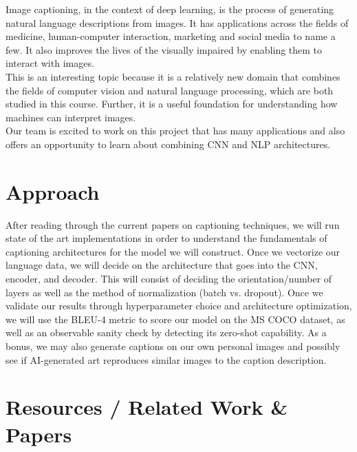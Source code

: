 \documentclass[10pt,twocolumn,letterpaper]{article}
\begin{document}
Image captioning, in the context of deep learning, is the process of generating natural language descriptions from images.
It has applications across the fields of medicine, human-computer interaction, marketing and social media to name a few.
It also improves the lives of the visually impaired by enabling them to interact with images.\\

This is an interesting topic because it is a relatively new domain
that combines the fields of computer vision and natural language processing, which are both studied in this course.
Further, it is a useful foundation for understanding how machines can interpret images. \\

Our team is excited to work on this project that has many applications and
also offers an opportunity to learn about combining CNN and NLP architectures.


\section{Approach}

After reading through the current papers on captioning techniques, we will run state of the art
implementations in order to understand the fundamentals of captioning architectures for the model we 
will construct.  Once we vectorize our language data, we will decide on the architecture that goes 
into the CNN, encoder, and decoder.  This will consist of deciding the orientation/number of layers 
as well as the method of normalization (batch vs. dropout).  Once we validate our results through 
hyperparameter choice and architecture optimization, we will use the BLEU-4 metric to score our model 
on the MS COCO dataset, as well as an observable sanity check by detecting its zero-shot capability. 
As a bonus, we may also generate captions on our own personal images and possibly see if AI-generated 
art reproduces similar images to the caption description.

\section{Resources / Related Work \& Papers}
\end{document}
